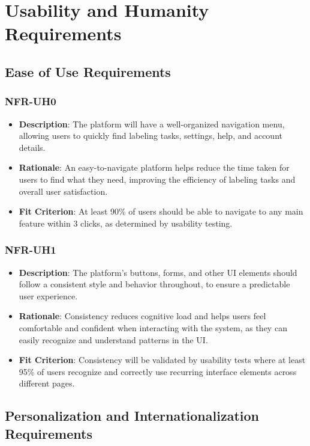 \documentclass[12pt]{article}
\begin{document}
\section{Usability and Humanity Requirements}

\subsection{Ease of Use Requirements}



\subsubsection*{NFR-UH0}
      \begin{itemize}
          \item \textbf{Description}: The platform will have a well-organized navigation menu, allowing users to quickly find labeling tasks, settings, help, and account details.  
          \item \textbf{Rationale}: An easy-to-navigate platform helps reduce the time taken for users to find what they need, improving the efficiency of labeling tasks and overall user satisfaction.  
          \item \textbf{Fit Criterion}: At least 90\% of users should be able to navigate to any main feature within 3 clicks, as determined by usability testing.
      \end{itemize}
\subsubsection*{NFR-UH1} 
      \begin{itemize}
          \item \textbf{Description}: The platform’s buttons, forms, and other UI elements should follow a consistent style and behavior throughout, to ensure a predictable user experience.  
          \item \textbf{Rationale}: Consistency reduces cognitive load and helps users feel comfortable and confident when interacting with the system, as they can easily recognize and understand patterns in the UI.  
          \item \textbf{Fit Criterion}: Consistency will be validated by usability tests where at least 95\% of users recognize and correctly use recurring interface elements across different pages.
      \end{itemize}


\subsection{Personalization and Internationalization Requirements}
\end{document}
